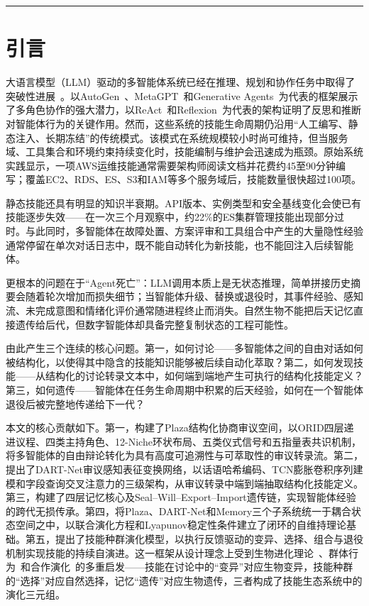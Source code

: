 \documentclass[12pt,a4paper]{ctexart}
\begin{document}
\vspace{12pt}
\hrule
\vspace{12pt}

\section{引言}

大语言模型（LLM）驱动的多智能体系统已经在推理、规划和协作任务中取得了突破性进展~\cite{wu2023autogen,park2023generative,hong2023metagpt,shinn2023reflexion,yao2022react}。以AutoGen~\cite{wu2023autogen}、MetaGPT~\cite{hong2023metagpt}和Generative Agents~\cite{park2023generative}为代表的框架展示了多角色协作的强大潜力，以ReAct~\cite{yao2022react}和Reflexion~\cite{shinn2023reflexion}为代表的架构证明了反思和推断对智能体行为的关键作用。然而，这些系统的技能生命周期仍沿用“人工编写、静态注入、长期冻结”的传统模式。该模式在系统规模较小时尚可维持，但当服务域、工具集合和环境约束持续变化时，技能编制与维护会迅速成为瓶颈。原始系统实践显示，一项AWS运维技能通常需要架构师阅读文档并花费约45至90分钟编写；覆盖EC2、RDS、ES、S3和IAM等多个服务域后，技能数量很快超过100项。

静态技能还具有明显的知识半衰期。API版本、实例类型和安全基线变化会使已有技能逐步失效——在一次三个月观察中，约22\%的ES集群管理技能出现部分过时。与此同时，多智能体在故障处置、方案评审和工具组合中产生的大量隐性经验通常停留在单次对话日志中，既不能自动转化为新技能，也不能回注入后续智能体。

更根本的问题在于“Agent死亡”：LLM调用本质上是无状态推理，简单拼接历史摘要会随着轮次增加而损失细节；当智能体升级、替换或退役时，其事件经验、感知流、未完成意图和情绪化评价通常随进程终止而消失。自然生物不能把后天记忆直接遗传给后代，但数字智能体却具备完整复制状态的工程可能性。

由此产生三个连续的核心问题。第一，如何讨论——多智能体之间的自由对话如何被结构化，以使得其中隐含的技能知识能够被后续自动化萃取？第二，如何发现技能——从结构化的讨论转录文本中，如何端到端地产生可执行的结构化技能定义？第三，如何遗传——智能体在任务生命周期中积累的后天经验，如何在一个智能体退役后被完整地传递给下一代？

本文的核心贡献如下。第一，构建了Plaza结构化协商审议空间，以ORID四层递进议程、四类主持角色、12-Niche环状布局、五类仪式信号和五指量表共识机制，将多智能体的自由辩论转化为具有高度可追溯性与可萃取性的审议转录流。第二，提出了DART-Net审议感知表征变换网络，以话语哈希编码、TCN膨胀卷积序列建模和字段查询交叉注意力的三级架构，从审议转录中端到端抽取结构化技能定义。第三，构建了四层记忆核心及Seal--Will--Export--Import遗传链，实现智能体经验的跨代无损传承。第四，将Plaza、DART-Net和Memory三个子系统统一于耦合状态空间之中，以联合演化方程和Lyapunov稳定性条件建立了闭环的自维持理论基础。第五，提出了技能种群演化模型，以执行反馈驱动的变异、选择、组合与退役机制实现技能的持续自演进。这一框架从设计理念上受到生物进化理论~\cite{darwin1859}、群体行为~\cite{reynolds1987flocks}和合作演化~\cite{nowak2006five}的多重启发——技能在讨论中的“变异”对应生物变异，技能种群的“选择”对应自然选择，记忆“遗传”对应生物遗传，三者构成了技能生态系统中的演化三元组。
\end{document}
